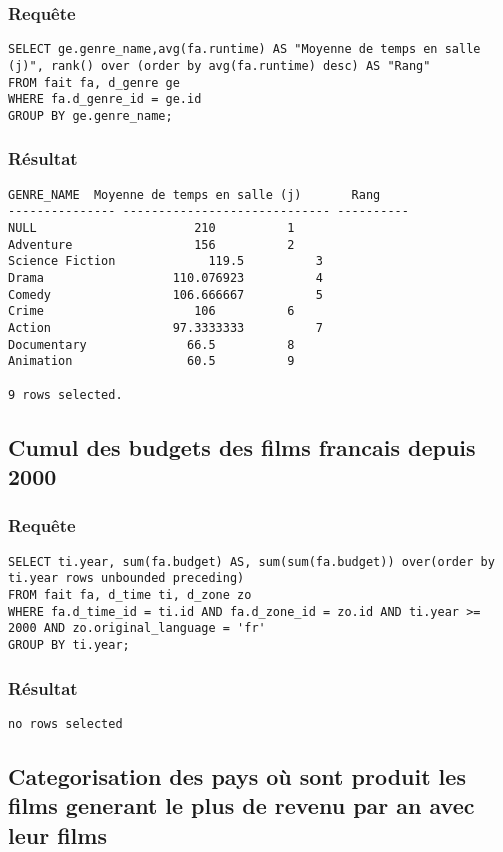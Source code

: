 \subsubsection{Requête}
\begin{lstlisting}
SELECT ge.genre_name,avg(fa.runtime) AS "Moyenne de temps en salle (j)", rank() over (order by avg(fa.runtime) desc) AS "Rang"
FROM fait fa, d_genre ge
WHERE fa.d_genre_id = ge.id
GROUP BY ge.genre_name;
\end{lstlisting}
\subsubsection{Résultat}
\begin{lstlisting}
GENRE_NAME	Moyenne de temps en salle (j)	    Rang
--------------- ----------------------------- ----------
NULL					  210	       1
Adventure				  156	       2
Science Fiction 			119.5	       3
Drama				   110.076923	       4
Comedy				   106.666667	       5
Crime					  106	       6
Action				   97.3333333	       7
Documentary				 66.5	       8
Animation				 60.5	       9

9 rows selected.
\end{lstlisting}

\subsection{Cumul des budgets des films francais depuis 2000}
\subsubsection{Requête}
\begin{lstlisting}
SELECT ti.year, sum(fa.budget) AS, sum(sum(fa.budget)) over(order by ti.year rows unbounded preceding)
FROM fait fa, d_time ti, d_zone zo
WHERE fa.d_time_id = ti.id AND fa.d_zone_id = zo.id AND ti.year >= 2000 AND zo.original_language = 'fr'
GROUP BY ti.year;
\end{lstlisting}
\subsubsection{Résultat}
\begin{lstlisting}
no rows selected

\end{lstlisting}

\subsection{Categorisation des pays où sont produit les films generant le plus de revenu par an avec leur films}

